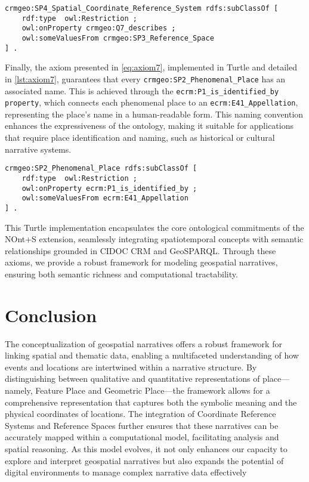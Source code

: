 \begin{lstlisting}[caption=Axiom \ref{eq:axiom6} in  in NOnt+S, label={lst:axiom6}]
crmgeo:SP4_Spatial_Coordinate_Reference_System rdfs:subClassOf [
    rdf:type  owl:Restriction ;
    owl:onProperty crmgeo:Q7_describes ;
    owl:someValuesFrom crmgeo:SP3_Reference_Space
] .
\end{lstlisting}

Finally, the axiom presented in \ref{eq:axiom7}, implemented in Turtle and detailed in \ref{lst:axiom7}, guarantees that every \texttt{crmgeo:SP2\_Phenomenal\_Place} has an associated name. This is achieved through the \texttt{ecrm:P1\_is\_identified\_by property}, which connects each phenomenal place to an \texttt{ecrm:E41\_Appellation}, representing the place's name in a human-readable form. This naming convention enhances the expressiveness of the ontology, making it suitable for applications that require place identification and naming, such as historical or cultural narrative systems.

\begin{lstlisting}[caption=Axiom \ref{eq:axiom7} in  in NOnt+S, label={lst:axiom7}]
crmgeo:SP2_Phenomenal_Place rdfs:subClassOf [
    rdf:type  owl:Restriction ;
    owl:onProperty ecrm:P1_is_identified_by ;
    owl:someValuesFrom ecrm:E41_Appellation
] .
\end{lstlisting}

This Turtle implementation encapsulates the core ontological commitments of the NOnt+S extension, seamlessly integrating spatiotemporal concepts with semantic relationships grounded in CIDOC CRM and GeoSPARQL. Through these axioms, we provide a robust framework for modeling geospatial narratives, ensuring both semantic richness and computational tractability.


\section{Conclusion}\label{V-sec:conclusion}
The conceptualization of geospatial narratives offers a robust framework for linking spatial and thematic data, enabling a multifaceted understanding of how events and locations are intertwined within a narrative structure. By distinguishing between qualitative and quantitative representations of place—namely, Feature Place and Geometric Place—the framework allows for a comprehensive representation that captures both the symbolic meaning and the physical coordinates of locations. The integration of Coordinate Reference Systems and Reference Spaces further ensures that these narratives can be accurately mapped within a computational model, facilitating analysis and spatial reasoning. As this model evolves, it not only enhances our capacity to explore and interpret geospatial narratives but also expands the potential of digital environments to manage complex narrative data effectively








